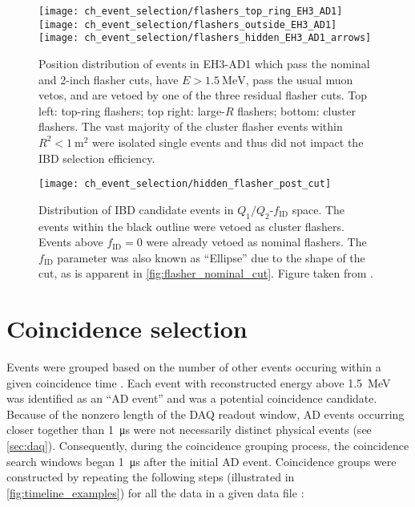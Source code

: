 \begin{figure}
    \centering
    \texttt{[image: ch\_event\_selection/flashers\_top\_ring\_EH3\_AD1]}
    \texttt{[image: ch\_event\_selection/flashers\_outside\_EH3\_AD1]}\\
    \texttt{[image: ch\_event\_selection/flashers\_hidden\_EH3\_AD1\_arrows]}
    \caption[Residual flasher position distributions]{
        Position distribution of events in EH3-AD1
        which pass the nominal and 2-inch flasher cuts,
        have $E > \SI{1.5}{\MeV}$, pass the usual muon vetos,
        and are vetoed by one of the three residual flasher cuts.
        Top left: top-ring flashers;
        top right: large-$R$ flashers;
        bottom: cluster flashers.
        The vast majority of the cluster flasher events
        within $R^2 < \SI{1}{\m\squared}$
        were isolated single events
        and thus did not impact the IBD selection efficiency.
    }
    \label{fig:flasher_resid_pos}
\end{figure}

\begin{figure}
    \centering
    \texttt{[image: ch\_event\_selection/hidden\_flasher\_post\_cut]}
    \caption[Cluster flasher variables]{
        Distribution of IBD candidate events in $Q_1/Q_2$-$f_{\text{ID}}$ space.
        The events within the black outline were vetoed as
        cluster flashers.
        Events above $f_{\text{ID}}=0$ were already vetoed as nominal flashers.
        The $f_\text{ID}$ parameter was also known as ``Ellipse''
        due to the shape of the cut, as is apparent in \cref{fig:flasher_nominal_cut}.
        Figure taken from \cite{flasher_plots}.
    }
    \label{fig:hidden_flasher_cut}
\end{figure}


\section{Coincidence selection}
\label{sec:coincidence}

Events were grouped based on the number of other events
occuring within a given coincidence time \tc.
Each event with reconstructed energy above \SI{1.5}{\mega\electronvolt}
was identified as an ``AD event''
and was a potential coincidence candidate.
Because of the nonzero length of the DAQ readout window,
AD events occurring closer together than \SI{1}{\micro\second}
were not necessarily distinct physical events (see \cref{sec:daq}).
Consequently, during the coincidence grouping process,
the coincidence search windows began \SI{1}{\micro\second}
after the initial AD event.
Coincidence groups were constructed by repeating the following steps
(illustrated in \cref{fig:timeline_examples})
for all the data in a given data file \cite{thucoinc2015}:

